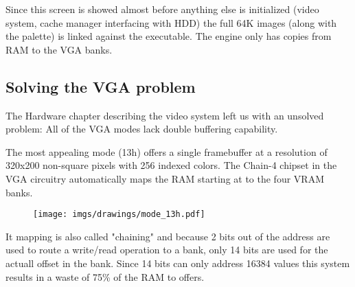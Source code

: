 \documentclass[book.tex]{subfiles}
\begin{document}
\par 
\begin{minipage}{\textwidth}

\end{minipage}
Since this screen is showed almost before anything else is initialized (video system, cache manager interfacing with HDD) the full 64K images (along with the palette) is linked against the executable. The engine only has copies from RAM to the VGA banks.\\
\par
{}




















\subsection{Solving the VGA problem}
The Hardware chapter describing the video system left us with an unsolved problem: All of the VGA modes lack double buffering capability.\\
\par
 The most appealing mode (13h) offers a single framebuffer at a resolution of 320x200 non-square pixels with 256 indexed colors. The Chain-4 chipset in the VGA circuitry automatically maps the RAM starting at  to the four VRAM banks. 
 \par
 \begin{figure}[H]
\centering
      \texttt{[image: imgs/drawings/mode\_13h.pdf]}
\end{figure}

It mapping is also called "chaining" and because 2 bits out of the address are used to route a write/read operation to a bank, only 14 bits are used for the actuall offset in the bank. Since 14 bits can only address 16384 values this system results in a waste of 75\% of the RAM to offers.\\
\end{document}
